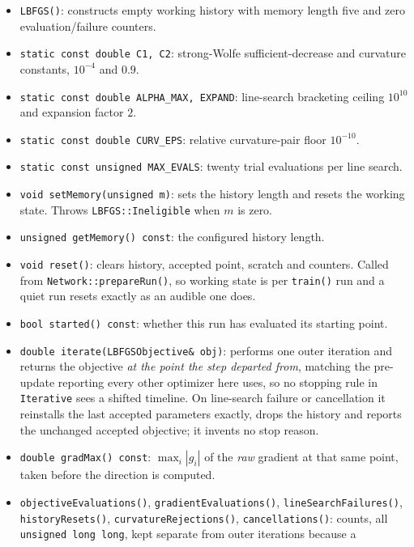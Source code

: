 \begin{itemize}
\item \texttt{LBFGS()}: constructs empty working history with memory length
      five and zero evaluation/failure counters.
\item \texttt{static const double C1, C2}: strong-Wolfe sufficient-decrease and
      curvature constants, $10^{-4}$ and $0.9$.
\item \texttt{static const double ALPHA\_MAX, EXPAND}: line-search bracketing
      ceiling $10^{10}$ and expansion factor $2$.
\item \texttt{static const double CURV\_EPS}: relative curvature-pair floor
      $10^{-10}$.
\item \texttt{static const unsigned MAX\_EVALS}: twenty trial evaluations per
      line search.
\item \texttt{void setMemory(unsigned m)}: sets the history length and resets
      the working state.  Throws \texttt{LBFGS::Ineligible} when $m$ is zero.
\item \texttt{unsigned getMemory() const}: the configured history length.
\item \texttt{void reset()}: clears history, accepted point, scratch and
      counters.  Called from \texttt{Network::prepareRun()}, so working state is
      per \texttt{train()} run and a quiet run resets exactly as an audible one
      does.
\item \texttt{bool started() const}: whether this run has evaluated its starting
      point.
\item \texttt{double iterate(LBFGSObjective\& obj)}: performs one outer
      iteration and returns the objective \emph{at the point the step departed
      from}, matching the pre-update reporting every other optimizer here uses,
      so no stopping rule in \texttt{Iterative} sees a shifted timeline.  On
      line-search failure or cancellation it reinstalls the last accepted
      parameters exactly, drops the history and reports the unchanged accepted
      objective; it invents no stop reason.
\item \texttt{double gradMax() const}: $\max_i |g_i|$ of the \emph{raw} gradient
      at that same point, taken before the direction is computed.
\item \texttt{objectiveEvaluations()}, \texttt{gradientEvaluations()},
      \texttt{lineSearchFailures()}, \texttt{historyResets()},
      \texttt{curvatureRejections()}, \texttt{cancellations()}: counts, all
      \texttt{unsigned long long}, kept separate from outer iterations because a

\end{itemize}
